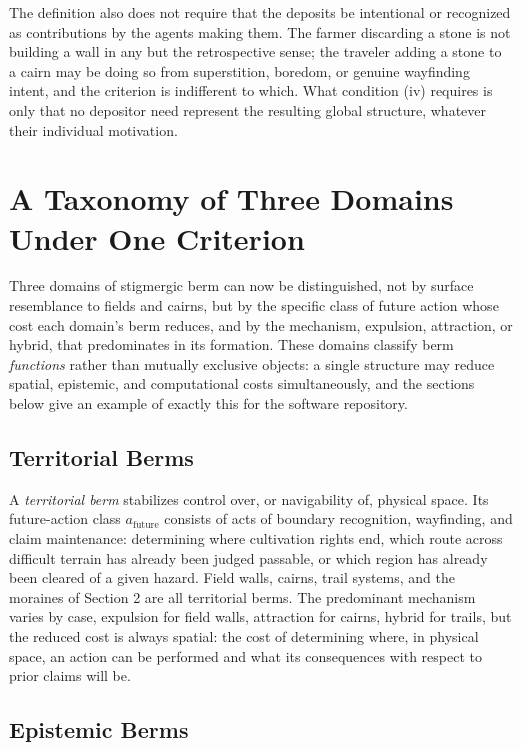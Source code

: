 \documentclass[11pt]{article}
\begin{document}
The definition also does not require that the deposits be intentional or recognized as contributions by the agents making them. The farmer discarding a stone is not building a wall in any but the retrospective sense; the traveler adding a stone to a cairn may be doing so from superstition, boredom, or genuine wayfinding intent, and the criterion is indifferent to which. What condition (iv) requires is only that no depositor need represent the resulting global structure, whatever their individual motivation.

\section{A Taxonomy of Three Domains Under One Criterion}

Three domains of stigmergic berm can now be distinguished, not by surface resemblance to fields and cairns, but by the specific class of future action whose cost each domain's berm reduces, and by the mechanism, expulsion, attraction, or hybrid, that predominates in its formation. These domains classify berm \emph{functions} rather than mutually exclusive objects: a single structure may reduce spatial, epistemic, and computational costs simultaneously, and the sections below give an example of exactly this for the software repository.

\subsection{Territorial Berms}

A \emph{territorial berm} stabilizes control over, or navigability of, physical space. Its future-action class $a_{\mathrm{future}}$ consists of acts of boundary recognition, wayfinding, and claim maintenance: determining where cultivation rights end, which route across difficult terrain has already been judged passable, or which region has already been cleared of a given hazard. Field walls, cairns, trail systems, and the moraines of Section 2 are all territorial berms. The predominant mechanism varies by case, expulsion for field walls, attraction for cairns, hybrid for trails, but the reduced cost is always spatial: the cost of determining where, in physical space, an action can be performed and what its consequences with respect to prior claims will be.

\subsection{Epistemic Berms}
\end{document}
